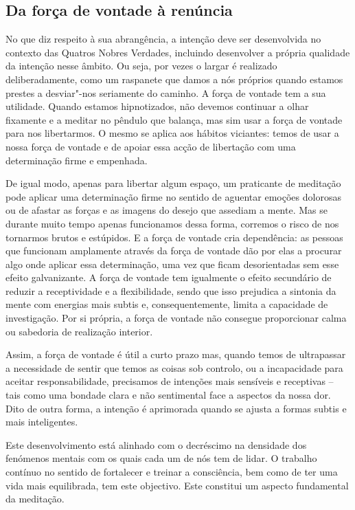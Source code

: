 \subsection{Da força de vontade à renúncia}

No que diz respeito à sua abrangência, a intenção deve ser desenvolvida no
contexto das Quatros Nobres Verdades, incluindo desenvolver a própria qualidade
da intenção nesse âmbito. Ou seja, por vezes o largar é realizado
deliberadamente, como um raspanete que damos a nós próprios quando estamos
prestes a desviar"-nos seriamente do caminho. A força de vontade tem a sua
utilidade. Quando estamos hipnotizados, não devemos continuar a olhar fixamente
e a meditar no pêndulo que balança, mas sim usar a força de vontade para nos
libertarmos. O mesmo se aplica aos hábitos viciantes: temos de usar a nossa
força de vontade e de apoiar essa acção de libertação com uma determinação firme
e empenhada.

De igual modo, apenas para libertar algum espaço, um praticante de meditação
pode aplicar uma determinação firme no sentido de aguentar emoções dolorosas ou
de afastar as forças e as imagens do desejo que assediam a mente. Mas se durante
muito tempo apenas funcionamos dessa forma, corremos o risco de nos tornarmos
brutos e estúpidos. E a força de vontade cria dependência: as pessoas que
funcionam amplamente através da força de vontade dão por elas a procurar algo
onde aplicar essa determinação, uma vez que ficam desorientadas sem esse efeito
galvanizante. A força de vontade tem igualmente o efeito secundário de reduzir a
receptividade e a flexibilidade, sendo que isso prejudica a sintonia da mente
com energias mais subtis e, consequentemente, limita a capacidade de
investigação. Por si própria, a força de vontade não consegue proporcionar calma
ou sabedoria de realização interior.

Assim, a força de vontade é útil a curto prazo mas, quando temos de ultrapassar
a necessidade de sentir que temos as coisas sob controlo, ou a incapacidade para
aceitar responsabilidade, precisamos de intenções mais sensíveis e receptivas --
tais como uma bondade clara e não sentimental face a aspectos da nossa dor. Dito
de outra forma, a intenção é aprimorada quando se ajusta a formas subtis e mais
inteligentes.

Este desenvolvimento está alinhado com o decréscimo na densidade dos fenómenos
mentais com os quais cada um de nós tem de lidar. O trabalho contínuo no sentido
de fortalecer e treinar a consciência, bem como de ter uma vida mais
equilibrada, tem este objectivo. Este constitui um aspecto fundamental da
meditação.

